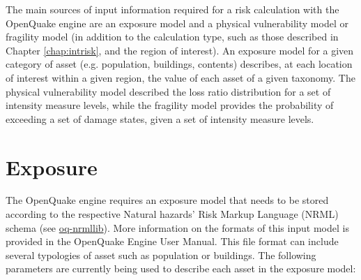 The main sources of input information required for a risk calculation with the OpenQuake engine are an \gls{exposure model} and a physical \gls{vulnerability model} or \gls{fragility model} (in addition to the calculation type, such as those described in Chapter \ref{chap:intrisk}, and the region of interest). An \gls{exposure model} for a given category of asset (e.g. population, buildings, contents) describes, at each location of interest within a given region, the value of each \gls{asset} of a given \gls{taxonomy}. The physical \gls{vulnerability model} described the loss ratio distribution for a set of intensity measure levels, while the \gls{fragility model} provides the probability of exceeding a set of damage states, given a set of intensity measure levels. %
\section{Exposure}
The OpenQuake engine requires an \gls{exposure model} that needs to be stored according to the respective Natural hazards' Risk Markup Language (NRML) schema (see \href{https://github.com/gem/oq-nrmllib}{oq-nrmllib}). More information on the formats of this input model is provided in the OpenQuake Engine User Manual. This file format can include several typologies of asset such as population or buildings. The following parameters are currently being used to describe each asset in the exposure model: 

